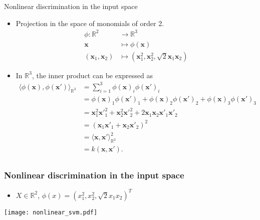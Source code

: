 \begin{frame}{Nonlinear discrimination in the input space}
  \begin{itemize}
  \item Projection in the space of monomials of order 2.
    \begin{align*}
      \phi :\mathbb{R}^2  & \to  \mathbb{R}^3\\
      \mathbf{x}          & \mapsto   \phi(\mathbf{x})\\
      (\mathbf{x}_1,\mathbf{x}_2)           & \mapsto  (\mathbf{x}_1^2,\mathbf{x}^2_2,\sqrt{2}\mathbf{x}_1\mathbf{x}_2)
    \end{align*}
    
  \item  In \(\mathbb{R}^3\), the inner product can be expressed as
    \begin{align*}
      \langle \phi(\mathbf{x}),\phi(\mathbf{x}')\rangle_{\mathbb{R}^3}&=   \sum_{\scriptscriptstyle i=1}^{\scriptscriptstyle 3}\phi(\mathbf{x})_i\phi(\mathbf{x}')_i \\
                                                                      &= \phi(\mathbf{x})_1\phi(\mathbf{x}')_1 + \phi(\mathbf{x})_2\phi(\mathbf{x}')_2 + \phi(\mathbf{x})_3\phi(\mathbf{x}')_3\\
                                                                      &= \mathbf{x}_1^2\mathbf{x'}_1^2 + \mathbf{x}_2^2\mathbf{x'}_2^2 + 2\mathbf{x}_1\mathbf{x}_2\mathbf{x'}_1\mathbf{x'}_2\\
                                                                      &= (\mathbf{x}_1\mathbf{x'}_1 + \mathbf{x}_2\mathbf{x'}_2)^2\\
                                                                      &= \langle \mathbf{x},\mathbf{x}'\rangle_{\mathbb{R}^2}^2\\
                                                                      &= k(\mathbf{x},\mathbf{x}').\\
      \end{align*}
      \end{itemize}
      
\end{frame}


\begin{frame}
  \frametitle{Nonlinear discrimination in the input space}

\begin{itemize}
 \item  $X \in \mathbb{R}^2$, $\phi(x)= (x_1^2,x_2^2,\sqrt{2}x_1 x_2)^T$
\end{itemize}

\begin{center}
\texttt{[image: nonlinear\_svm.pdf]}\\
\end{center}


\end{frame}



